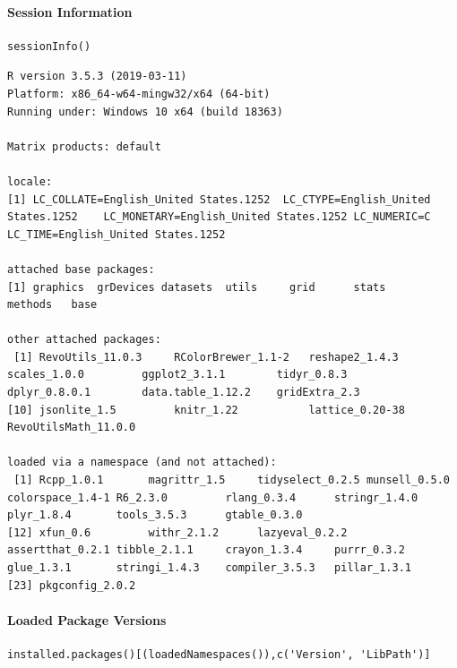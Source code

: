 \documentclass[11pt]{article}
\begin{document}
\paragraph{Session Information}
\label{sec:orgcb12abe}

\begin{verbatim}
sessionInfo()
\end{verbatim}

\begin{verbatim}
R version 3.5.3 (2019-03-11)
Platform: x86_64-w64-mingw32/x64 (64-bit)
Running under: Windows 10 x64 (build 18363)

Matrix products: default

locale:
[1] LC_COLLATE=English_United States.1252  LC_CTYPE=English_United States.1252    LC_MONETARY=English_United States.1252 LC_NUMERIC=C                           LC_TIME=English_United States.1252    

attached base packages:
[1] graphics  grDevices datasets  utils     grid      stats     methods   base     

other attached packages:
 [1] RevoUtils_11.0.3     RColorBrewer_1.1-2   reshape2_1.4.3       scales_1.0.0         ggplot2_3.1.1        tidyr_0.8.3          dplyr_0.8.0.1        data.table_1.12.2    gridExtra_2.3       
[10] jsonlite_1.5         knitr_1.22           lattice_0.20-38      RevoUtilsMath_11.0.0

loaded via a namespace (and not attached):
 [1] Rcpp_1.0.1       magrittr_1.5     tidyselect_0.2.5 munsell_0.5.0    colorspace_1.4-1 R6_2.3.0         rlang_0.3.4      stringr_1.4.0    plyr_1.8.4       tools_3.5.3      gtable_0.3.0    
[12] xfun_0.6         withr_2.1.2      lazyeval_0.2.2   assertthat_0.2.1 tibble_2.1.1     crayon_1.3.4     purrr_0.3.2      glue_1.3.1       stringi_1.4.3    compiler_3.5.3   pillar_1.3.1    
[23] pkgconfig_2.0.2 
\end{verbatim}

\paragraph{Loaded Package Versions}
\label{sec:org871f4cb}

\begin{verbatim}
installed.packages()[(loadedNamespaces()),c('Version', 'LibPath')]
\end{verbatim}
\end{document}
